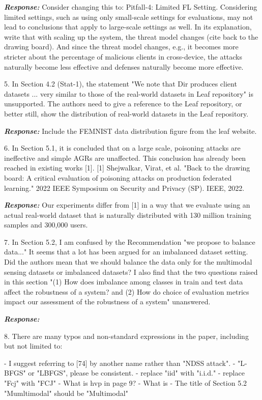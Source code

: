 \textbf{\textit{Response:}}
Consider changing this to:
Pitfall-4: Limited FL Setting. Considering limited settings, such as using only small-scale settings for evaluations, may not lead to conclusions that apply to large-scale settings as well.
In its explanation, write that with scaling up the system, the threat model changes (cite back to the drawing board). And since the threat model changes, e.g., it becomes more stricter about the percentage of malicious clients in cross-device, the attacks naturally become less effective and defenses naturally become more effective.

5. In Section 4.2 (Stat-1), the statement "We note that Dir produces client datasets ... very similar to those of the real-world datasets in Leaf repository" is unsupported. The authors need to give a reference to the Leaf repository, or better still, show the distribution of real-world datasets in the Leaf repository.

\textbf{\textit{Response:}}
Include the FEMNIST data distribution figure from the leaf website.

6. In Section 5.1, it is concluded that on a large scale, poisoning attacks are ineffective and simple AGRs are unaffected. This conclusion has already been reached in existing works [1].
[1] Shejwalkar, Virat, et al. "Back to the drawing board: A critical evaluation of poisoning attacks on production federated learning." 2022 IEEE Symposium on Security and Privacy (SP). IEEE, 2022.

\textbf{\textit{Response:}}
Our experiments differ from [1] in a way that we evaluate using an actual real-world dataset that is naturally distributed with 130 million training samples and 300,000 users.

7. In Section 5.2, I am confused by the Recommendation "we propose to balance data..." It seems that a lot has been argued for an imbalanced dataset setting. Did the authors mean that we should balance the data only for the multimodal sensing datasets or imbalanced datasets? I also find that the two questions raised in this section "(1) How does imbalance among classes in train and test data affect the robustness of a system? and (2) How do choice of evaluation metrics impact our assessment of the robustness of a system" unanswered.

\textbf{\textit{Response:}}

8. There are many typos and non-standard expressions in the paper, including but not limited to:

- I suggest referring to [74] by another name rather than "NDSS attack".
- "L-BFGS" or "LBFGS", please be consistent.
- replace "iid" with "i.i.d."
- replace "Fcj" with "FCJ"
- What is hvp in page 9?
- What is %
- The title of Section 5.2 "Mumltimodal" should be "Multimodal"

